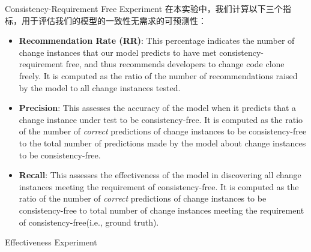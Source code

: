 {Consistency-Requirement Free Experiment}
在本实验中，我们计算以下三个指标，用于评估我们的模型的一致性无需求的可预测性：
\begin{itemize}
\item \textbf{Recommendation Rate (RR)}: 
This percentage indicates the number of change instances that our model predicts to have met consistency-requirement free, and thus recommends developers to change code clone freely.
It is computed as the ratio of the number of recommendations raised by the model to all change instances tested.
\item \textbf{Precision}: 
This assesses the accuracy of the model when it predicts that a change instance under test to be consistency-free. It is computed as the ratio of the number of {\em correct} predictions of change instances to be consistency-free to the total number of predictions made by the model about change instances to be consistency-free.
\item \textbf{Recall}: 
This assesses the effectiveness of the model in discovering all change instances meeting the requirement of consistency-free.
It is computed as the ratio of the number of {\em correct} predictions of change instances to be consistency-free to total number of change instances meeting the requirement of consistency-free(i.e., ground truth).
\end{itemize}

{Effectiveness Experiment}

